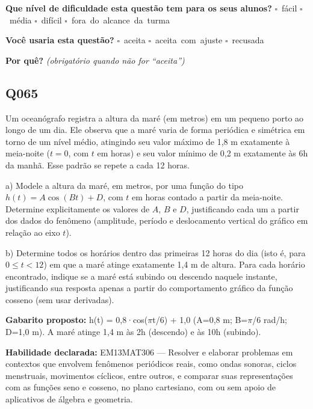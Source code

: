 \documentclass[11pt,a4paper]{article}
\begin{document}
\textbf{Que nível de dificuldade esta questão tem para os seus alunos?}\quad
\mbox{$\square$~fácil} \quad \mbox{$\square$~média} \quad
\mbox{$\square$~difícil} \quad \mbox{$\square$~fora do alcance da turma}

\textbf{Você usaria esta questão?}\quad
\mbox{$\square$~aceita} \quad \mbox{$\square$~aceita com ajuste} \quad
\mbox{$\square$~recusada}

\textbf{Por quê?} \emph{(obrigatório quando não for ``aceita'')}

\underline{\hspace{\linewidth}}

\underline{\hspace{\linewidth}}
\vspace{0.6em}

\begin{samepage}
\subsection*{Q065}
Um oceanógrafo registra a altura da maré (em metros) em um pequeno porto ao longo de um dia. Ele observa que a maré varia de forma periódica e simétrica em torno de um nível médio, atingindo seu valor máximo de 1,8 m exatamente à meia-noite ($t=0$, com $t$ em horas) e seu valor mínimo de 0,2 m exatamente às 6h da manhã. Esse padrão se repete a cada 12 horas.

a) Modele a altura da maré, em metros, por uma função do tipo $h(t) = A\cos(Bt) + D$, com $t$ em horas contado a partir da meia-noite. Determine explicitamente os valores de $A$, $B$ e $D$, justificando cada um a partir dos dados do fenômeno (amplitude, período e deslocamento vertical do gráfico em relação ao eixo $t$).

b) Determine todos os horários dentro das primeiras 12 horas do dia (isto é, para $0 \le t < 12$) em que a maré atinge exatamente 1,4 m de altura. Para cada horário encontrado, indique se a maré está subindo ou descendo naquele instante, justificando sua resposta apenas a partir do comportamento gráfico da função cosseno (sem usar derivadas).

\textbf{Gabarito proposto:} h(t) = 0,8·cos($\pi$t/6) + 1,0 (A=0,8 m; B=$\pi$/6 rad/h; D=1,0 m). A maré atinge 1,4 m às 2h (descendo) e às 10h (subindo).

\textbf{Habilidade declarada:} EM13MAT306 --- Resolver e elaborar problemas em contextos que envolvem fenômenos periódicos reais, como ondas sonoras, ciclos menstruais, movimentos cíclicos, entre outros, e comparar suas representações com as funções seno e cosseno, no plano cartesiano, com ou sem apoio de aplicativos de álgebra e geometria.
\end{samepage}
\end{document}
